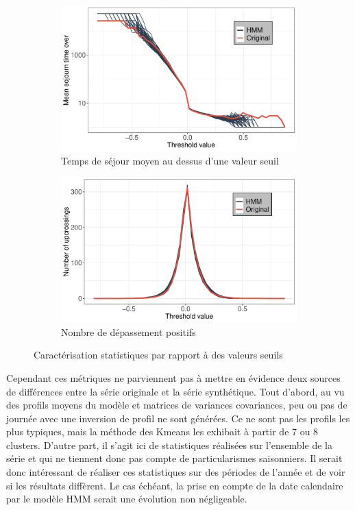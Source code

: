 \documentclass[12pt]{report}
\begin{document}
\begin{figure}[h] 
	\begin{subfigure}[b]{0.5\linewidth}
		\centering
		\includegraphics[width = 0.95 \linewidth]{Images/PV/HMM/Stats/MDO.pdf}
		\caption{Temps de séjour moyen au dessus d'une valeur seuil}
		\label{fig:PV_HMM_Stat_MDO}
	\end{subfigure}%
	\begin{subfigure}[b]{0.5\linewidth}
		\centering
		\includegraphics[width = 0.95 \linewidth]{Images/PV/HMM/Stats/NU.pdf}
		\caption{Nombre de dépassement positifs}
		\label{fig:PV_HMM_Stat_NU}
	\end{subfigure}
	
	\caption{Caractérisation statistiques par rapport à des valeurs seuils}
	\label{fig:PV_HMM_Stat_MDONU} 
\end{figure}

Cependant ces métriques ne parviennent pas à mettre en évidence deux sources de différences entre la série originale et la série synthétique. Tout d'abord, au vu des profils moyens du modèle et matrices de variances covariances, peu ou pas de journée avec une inversion de profil ne sont générées. Ce ne sont pas les profils les plus typiques, mais la méthode des Kmeans les exhibait à partir de 7 ou 8 clusters. D'autre part, il s'agit ici de statistiques réalisées sur l'ensemble de la série et qui ne tiennent donc pas compte de particularismes saisonniers. Il serait donc intéressant de réaliser ces statistiques sur des périodes de l'année et de voir si les résultats diffèrent. Le cas échéant, la prise en compte de la date calendaire par le modèle HMM serait une évolution non négligeable.
\end{document}

